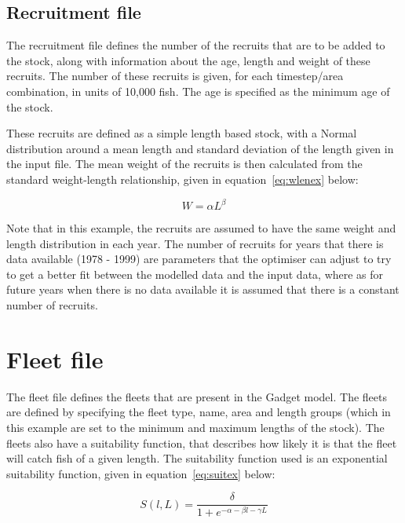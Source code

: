 \documentclass[10pt,titlepage]{article}
\begin{document}
{\small }

\subsection{Recruitment file}
The recruitment file defines the number of the recruits that are to be added to the stock, along with information about the age, length and weight of these recruits.  The number of these recruits is given, for each timestep/area combination, in units of 10,000 fish.  The age is specified as the minimum age of the stock.

\bigskip
These recruits are defined as a simple length based stock, with a Normal distribution around a mean length and standard deviation of the length given in the input file.  The mean weight of the recruits is then calculated from the standard weight-length relationship, given in equation~\ref{eq:wlenex} below:

\begin{equation}\label{eq:wlenex}
W = \alpha L ^\beta
\end{equation}

Note that in this example, the recruits are assumed to have the same weight and length distribution in each year.  The number of recruits for years that there is data available (1978 - 1999) are parameters that the optimiser can adjust to try to get a better fit between the modelled data and the input data, where as for future years when there is no data available it is assumed that there is a constant number of recruits.

{\small }

\section{Fleet file}
The fleet file defines the fleets that are present in the Gadget model.  The fleets are defined by specifying the fleet type, name, area and length groups (which in this example are set to the minimum and maximum lengths of the stock).  The fleets also have a suitability function, that describes how likely it is that the fleet will catch fish of a given length.  The suitability function used is an exponential suitability function, given in equation~\ref{eq:suitex} below:

\begin{equation}\label{eq:suitex}
S(l,L) = { \frac{\delta}{1 + e^{- \alpha - \beta l - \gamma  L}}}
\end{equation}
\end{document}
